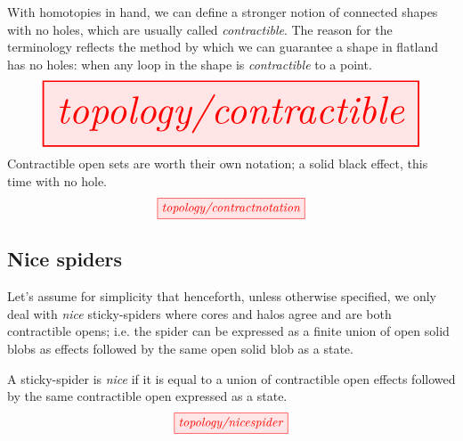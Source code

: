 \clearpage

\begin{example}[Contractibility]\label{defn:contractible}
With homotopies in hand, we can define a stronger notion of connected shapes with no holes, which are usually called \emph{contractible}. The reason for the terminology reflects the method by which we can guarantee a shape in flatland has no holes: when any loop in the shape is \emph{contractible} to a point.
\[\resizebox{\textwidth}{!}{\tikzfig{topology/contractible}}\]
Contractible open sets are worth their own notation; a solid black effect, this time with no hole.
\[\tikzfig{topology/contractnotation}\]
\end{example}

\subsection{Nice spiders}

Let's assume for simplicity that henceforth, unless otherwise specified, we only deal with \emph{nice} sticky-spiders where cores and halos agree and are both contractible opens; i.e. the spider can be expressed as a finite union of open solid blobs as effects followed by the same open solid blob as a state.

\begin{defn}
A sticky-spider is \emph{nice} if it is equal to a union of contractible open effects followed by the same contractible open expressed as a state.
\[\tikzfig{topology/nicespider}\]
\end{defn}